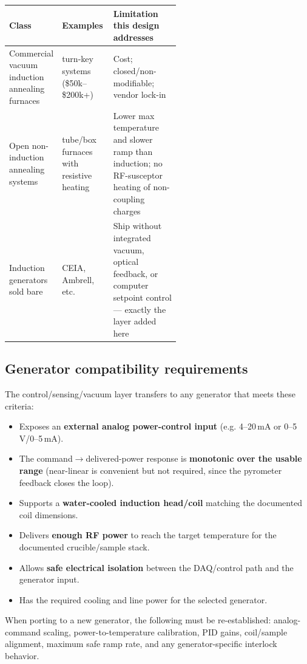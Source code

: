 \documentclass[5p,times]{elsarticle}
\begin{document}
\begin{table}[ht]
\small
\begin{tabularx}{\linewidth}{L{0.26\linewidth} L{0.30\linewidth} X}
\toprule
\textbf{Class} & \textbf{Examples} & \textbf{Limitation this design addresses} \\
\midrule
Commercial vacuum induction annealing furnaces & turn-key systems (\$50k--\$200k+) & Cost; closed/non-modifiable; vendor lock-in \\
Open non-induction annealing systems & tube/box furnaces with resistive heating & Lower max temperature and slower ramp than induction; no RF-susceptor heating of non-coupling charges \\
Induction generators sold bare & CEIA, Ambrell, etc. & Ship without integrated vacuum, optical feedback, or computer setpoint control --- exactly the layer added here \\
\bottomrule
\end{tabularx}
\end{table}

\subsection{Generator compatibility requirements}

The control/sensing/vacuum layer transfers to any generator that meets these
criteria:

\begin{itemize}[nosep]
\item Exposes an \textbf{external analog power-control input} (e.g. 4--20\,mA or 0--5\,V/0--5\,mA).
\item The command$\rightarrow$delivered-power response is \textbf{monotonic over the usable range} (near-linear is convenient but not required, since the pyrometer feedback closes the loop).
\item Supports a \textbf{water-cooled induction head/coil} matching the documented coil dimensions.
\item Delivers \textbf{enough RF power} to reach the target temperature for the documented crucible/sample stack.
\item Allows \textbf{safe electrical isolation} between the DAQ/control path and the generator input.
\item Has the required cooling and line power for the selected generator.
\end{itemize}

When porting to a new generator, the following must be re-established:
analog-command scaling, power-to-temperature calibration, PID gains, coil/sample
alignment, maximum safe ramp rate, and any generator-specific interlock behavior.
\end{document}
